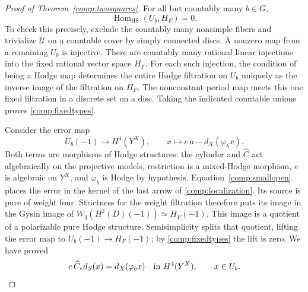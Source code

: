 \documentclass[11pt]{amsart}
\DeclareMathOperator{\Hom}{Hom}
\theoremstyle{definition}
\theoremstyle{remark}
\numberwithin{equation}{section}
\begin{document}
\begin{proof}[Proof of Theorem~\ref{comp:twosquares}]
For all but countably many $b\in G$,
\begin{equation}\label{comp:fixedtypes}
 \Hom_{\mathrm{HS}}(U_b,H_F)=0.
\end{equation}
To check this precisely, exclude the countably many nonsimple fibers and
trivialize $\mathscr U$ on a countable cover by simply connected discs.
A nonzero map from a remaining $U_b$ is injective.  There are countably
many rational linear injections into the fixed rational vector space
$H_F$.  For each such injection, the condition of being a Hodge map
determines the entire Hodge filtration on $U_b$ uniquely as the inverse
image of the filtration on $H_F$.  The nonconstant period map meets this
one fixed filtration in a discrete set on a disc.  Taking the indicated
countable unions proves \eqref{comp:fixedtypes}.

Consider the error map
\[
 U_b(-1)\longrightarrow H^4(Y^X),
 \qquad x\longmapsto e\,a-d_X(\varphi_bx).
\]
Both terms are morphisms of Hodge structures: the cylinder and
$\widehat C$ act algebraically on the projective models, restriction is
a mixed-Hodge morphism, $e$ is algebraic on $Y^X$, and $\varphi_b$ is
Hodge by hypothesis.  Equation~\eqref{comp:smallopen} places the error
in the kernel of the last arrow of \eqref{comp:localization}.
Its source is pure of weight four.  Strictness for the weight filtration
\cite[Theorem~2.3.5\textup{(iii)}]{DeligneHodgeII} therefore puts its image in the
Gysin image of $W_4(H^2(D)(-1))\simeq H_F(-1)$.
This image is a quotient of a polarizable pure Hodge structure.
Semisimplicity splits that quotient, lifting the error map to
$U_b(-1)\to H_F(-1)$; by
\eqref{comp:fixedtypes} the lift is zero.  We have proved
\begin{equation}\label{comp:largeopen}
 e\,\widehat C_*d_S(x)=d_X(\varphi_bx)
 \quad\hbox{in }H^4(Y^X),\qquad x\in U_b.
\end{equation}


\end{proof}
\end{document}
